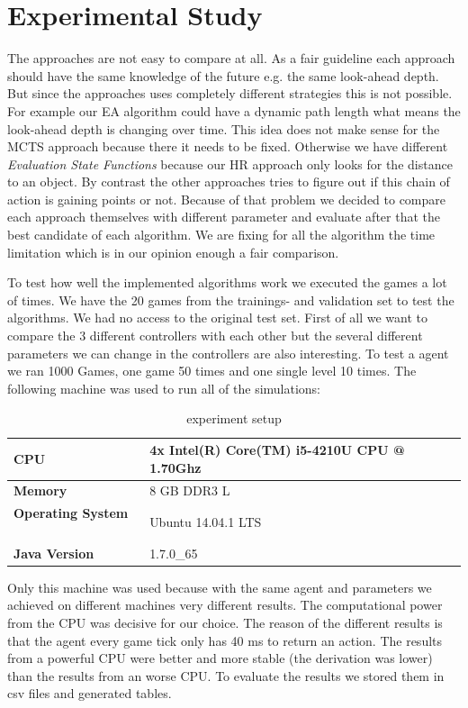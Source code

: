 
\section{Experimental Study} 
\label{sec:exp}

The approaches are not easy to compare at all. As a fair guideline each approach should have the same knowledge of the future e.g. the same look-ahead depth.
But since the approaches uses completely different strategies this is not possible. For example our \ac{EA} algorithm could have a
dynamic path length what means the look-ahead depth is changing over time. This idea does not make sense for the \ac{MCTS} approach because there it needs
to be fixed. Otherwise we have different \textit{Evaluation State Functions} because our \ac{HR} approach only looks for the distance to an object. By contrast 
the other approaches tries to figure out if this chain of action is gaining points or not.
Because of that problem we decided to compare each approach themselves with different parameter and evaluate after that the best candidate of each algorithm.
We are fixing for all the algorithm the time limitation which is in our opinion enough a fair comparison.

To test how well the implemented algorithms work we executed the games a lot of times. We have the 20 games from the trainings- and validation set to test the algorithms. We had no access to the original test set. First of all we want to compare the 3 different controllers with each other but the several different parameters we can change in the controllers are also interesting.
To test a agent we ran 1000 Games, one game 50 times and one single level 10 times. The following machine was used to run all of the simulations:

\begin{table}
\center
\begin{tabular}{ll} 
\textbf{CPU} & 4x Intel(R) Core(TM) i5-4210U CPU @ 1.70Ghz \\ \hline
\textbf{Memory} & 8 GB DDR3 L \\  \hline
\textbf{Operating System} \mbox{   } & Ubuntu 14.04.1 LTS \\  \hline
\textbf{Java Version} &  1.7.0\_65\\  
\end{tabular}
\caption{experiment setup}
\end{table}


Only this machine was used because with the same agent and parameters we achieved on different machines very different results. The computational power from the CPU was decisive for our choice. The reason of the different results is that the agent every game tick only has 40 ms to return an action. The results from a powerful CPU were better and more stable (the derivation was lower) than the results from an worse CPU. To evaluate the results we stored them in csv files and generated tables.

